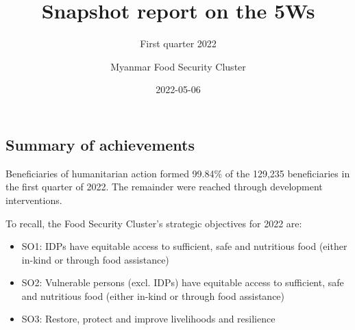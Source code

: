 \documentclass[
]{article}
\title{Snapshot report on the 5Ws}
\subtitle{First quarter 2022}
\author{Myanmar Food Security Cluster}
\date{2022-05-06}
\providecommand{\tightlist}{%
  \setlength{\itemsep}{0pt}\setlength{\parskip}{0pt}}
\begin{document}
\maketitle

\hypertarget{summary-of-achievements}{%
\subsection{Summary of achievements}\label{summary-of-achievements}}

Beneficiaries of humanitarian action formed 99.84\% of the 129,235
beneficiaries in the first quarter of 2022. The remainder were reached
through development interventions.

To recall, the Food Security Cluster's strategic objectives for 2022
are:

\begin{itemize}
\tightlist
\item
  SO1: IDPs have equitable access to sufficient, safe and nutritious
  food (either in-kind or through food assistance)
\item
  SO2: Vulnerable persons (excl. IDPs) have equitable access to
  sufficient, safe and nutritious food (either in-kind or through food
  assistance)
\item
  SO3: Restore, protect and improve livelihoods and resilience
\end{itemize}
\end{document}
